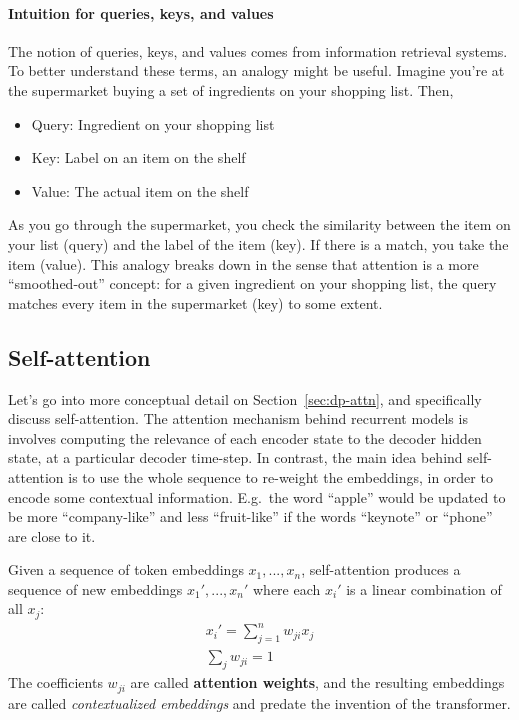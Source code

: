 \documentclass[11pt]{article}
\numberwithin{equation}{section}
\begin{document}
\paragraph{Intuition for queries, keys, and values} The notion of queries, keys, and values comes from information retrieval systems. To better understand these terms, an analogy might be useful. Imagine you're at the supermarket buying a set of ingredients on your shopping list. Then,
\begin{itemize}[noitemsep]
\item Query: Ingredient on your shopping list
\item Key: Label on an item on the shelf
\item Value: The actual item on the shelf
\end{itemize}
As you go through the supermarket, you check the similarity between the item on your list (query) and the label of the item (key). If there is a match, you take the item (value). This analogy breaks down in the sense that attention is a more ``smoothed-out'' concept: for a given ingredient on your shopping list, the query matches every item in the supermarket (key) to some extent.



\subsection{Self-attention}
Let's go into more conceptual detail on Section~\ref{sec:dp-attn}, and specifically discuss self-attention. The attention mechanism behind recurrent models is involves computing the relevance of each encoder state to the decoder hidden state, at a particular decoder time-step. In contrast, the main idea behind self-attention is to use the whole sequence to re-weight the embeddings, in order to encode some contextual information. E.g.\ the word ``apple'' would be updated to be more ``company-like'' and less ``fruit-like'' if the words ``keynote'' or ``phone'' are close to it. 

Given a sequence of token embeddings $x_1,...,x_n$, self-attention produces a sequence of new embeddings $x_1',...,x_n'$  where each $x_i'$ is a linear combination of all $x_j$:
\begin{align}
x_i' = \sum_{j=1}^n w_{ji} x_j \\
\sum_{j}w_{ji} = 1
\end{align}
The coefficients $w_{ji}$ are called \textbf{attention weights}, and the resulting embeddings are called \textit{contextualized embeddings} and predate the invention of the transformer. 
\end{document}
